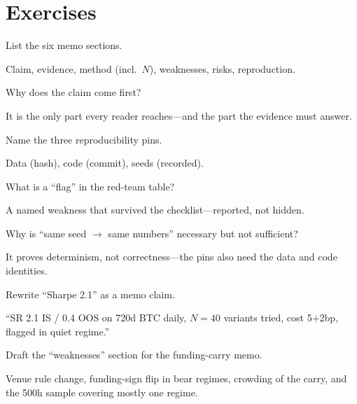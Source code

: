 \section{Exercises}
\begin{exercise}[easy]
List the six memo sections.
\end{exercise}
\begin{solution}
Claim, evidence, method (incl.\ $N$), weaknesses, risks, reproduction.
\end{solution}

\begin{exercise}[easy]
Why does the claim come first?
\end{exercise}
\begin{solution}
It is the only part every reader reaches---and the part the evidence must answer.
\end{solution}

\begin{exercise}[easy]
Name the three reproducibility pins.
\end{exercise}
\begin{solution}
Data (hash), code (commit), seeds (recorded).
\end{solution}

\begin{exercise}[easy]
What is a ``flag'' in the red-team table?
\end{exercise}
\begin{solution}
A named weakness that survived the checklist---reported, not hidden.
\end{solution}

\begin{exercise}[easy]
Why is ``same seed $\to$ same numbers'' necessary but not sufficient?
\end{exercise}
\begin{solution}
It proves determinism, not correctness---the pins also need the data and code identities.
\end{solution}

\begin{exercise}
Rewrite ``Sharpe 2.1'' as a memo claim.
\end{exercise}
\begin{solution}
``SR 2.1 IS / 0.4 OOS on 720d BTC daily, $N{=}40$ variants tried, cost 5+2bp, flagged
in quiet regime.''
\end{solution}

\begin{exercise}
Draft the ``weaknesses'' section for the funding-carry memo.
\end{exercise}
\begin{solution}
Venue rule change, funding-sign flip in bear regimes, crowding of the carry, and the
500h sample covering mostly one regime.
\end{solution}

